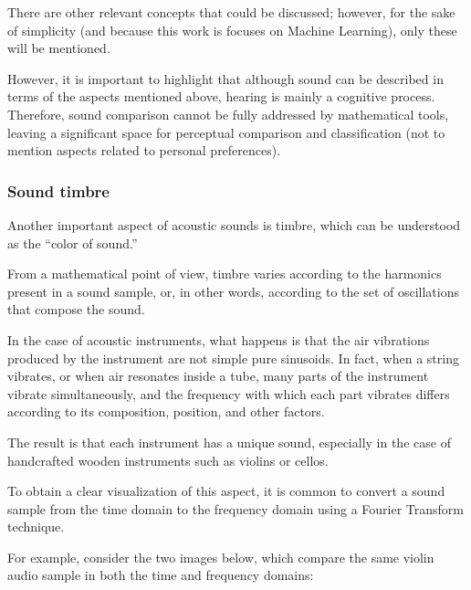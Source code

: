 \documentclass[sigconf,natbib=false]{acmart}
\begin{document}
There are other relevant concepts that could be discussed; however, for the sake of simplicity (and because this work is focuses on Machine Learning), only these will be mentioned.

However, it is important to highlight that although sound can be described in terms of the aspects mentioned above, hearing is mainly a cognitive process. Therefore, sound comparison cannot be fully addressed by mathematical tools, leaving a significant space for perceptual comparison and classification (not to mention aspects related to personal preferences).

\subsubsection{Sound timbre}

Another important aspect of acoustic sounds is timbre, which can be understood as the “color of sound.”

From a mathematical point of view, timbre varies according to the harmonics present in a sound sample, or, in other words, according to the set of oscillations that compose the sound.

In the case of acoustic instruments, what happens is that the air vibrations produced by the instrument are not simple pure sinusoids. In fact, when a string vibrates, or when air resonates inside a tube, many parts of the instrument vibrate simultaneously, and the frequency with which each part vibrates differs according to its composition, position, and other factors.

The result is that each instrument has a unique sound, especially in the case of handcrafted wooden instruments such as violins or cellos.

To obtain a clear visualization of this aspect, it is common to convert a sound sample from the time domain to the frequency domain using a Fourier Transform technique.

For example, consider the two images below, which compare the same violin audio sample in both the time and frequency domains:
\end{document}
